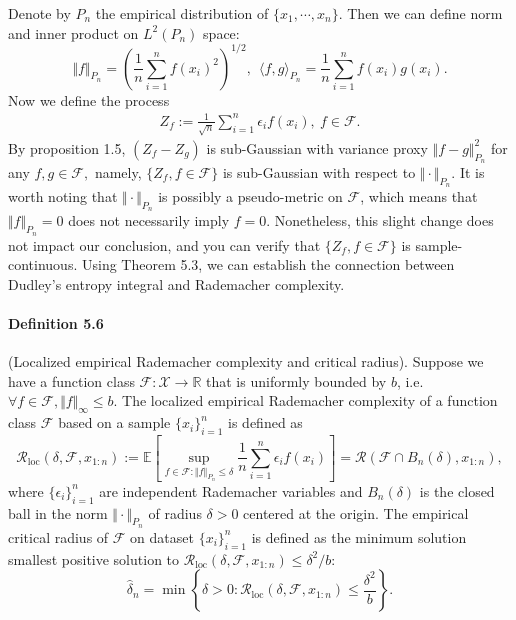 \documentclass{article}
\newcommand{\E}{\mathbb{E}}
\begin{document}
Denote by $P_n$ the empirical distribution of $\{x_1,\cdots,x_n\}.$ Then we can define norm and inner product on $L^2(P_n)$ space:
\begin{equation*}
	\Vert f\Vert_{P_n} = \left(\frac{1}{n}\sum_{i=1}^n f(x_i)^2\right)^{1/2},\ \ \langle f,g\rangle_{P_n} = \frac{1}{n}\sum_{i=1}^n f(x_i)g(x_i).\tag{5.18}
\end{equation*}
Now we define the process
\begin{align*}
	Z_f := \frac{1}{\sqrt{n}}\sum_{i=1}^n\epsilon_i f(x_i),\ f\in\mathcal{F}. \tag{5.19}
\end{align*}
By proposition 1.5, $(Z_f - Z_g)$ is sub-Gaussian with variance proxy $\Vert f - g\Vert_{P_n}^2$ for any $f,g\in\mathcal{F},$ namely, $\{Z_f,f\in\mathcal{F}\}$ is sub-Gaussian with respect to $\Vert\cdot\Vert_{P_n}.$ It is worth noting that $\Vert\cdot\Vert_{P_n}$ is possibly a pseudo-metric on $\mathcal{F}$, which means that $\Vert f\Vert_{P_n}=0$ does not necessarily imply $f=0.$ Nonetheless, this slight change does not impact our conclusion, and you can verify that $\{Z_f,f\in\mathcal{F}\}$ is sample-continuous. Using Theorem 5.3, we can establish the connection between Dudley's entropy integral and Rademacher complexity.

\paragraph{Definition 5.6} (Localized empirical Rademacher complexity and critical radius). Suppose we have a function class $\mathcal{F}:\mathcal{X}\to\mathbb{R}$ that is uniformly bounded by $b$, i.e. $\forall f\in\mathcal{F},\Vert f\Vert_\infty \leq b$. The localized empirical Rademacher complexity of a function class $\mathcal{F}$ based on a sample $\{x_i\}_{i=1}^n$ is defined as
\begin{equation*}
	\mathcal{R}_{\mathrm{loc}}(\delta,\mathcal{F},x_{1:n}) := \E\left[\sup_{f\in\mathcal{F}:\Vert f\Vert_{P_n}\leq\delta}\frac{1}{n}\sum_{i=1}^n\epsilon_if(x_i)\right] = \mathcal{R}(\mathcal{F}\cap B_n(\delta),x_{1:n}),\tag{5.20}
\end{equation*}
where $\{\epsilon_i\}_{i=1}^n$ are independent Rademacher variables and $B_n(\delta)$ is the closed ball in the norm $\Vert\cdot\Vert_{P_n}$ of radius $\delta > 0$ centered at the origin.
The empirical critical radius of $\mathcal{F}$ on dataset $\{x_i\}_{i=1}^n$ is defined as the minimum solution smallest positive solution to $\mathcal{R}_{\mathrm{loc}}(\delta,\mathcal{F},x_{1:n})\leq\delta^2/b$:
\begin{equation*}
	\widehat{\delta}_n = \min\left\{\delta > 0:\mathcal{R}_{\mathrm{loc}}(\delta,\mathcal{F},x_{1:n})\leq\frac{\delta^2}{b}\right\}.\tag{5.21}
\end{equation*}
\end{document}
